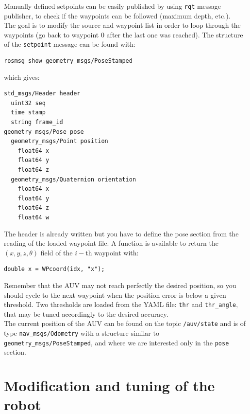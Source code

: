 \documentclass{ecnreport}
\begin{document}
Manually defined setpoints can be easily published by using \texttt{rqt} message publisher, to check if the waypoints can be followed (maximum depth, etc.).\\

The goal is to modify the source and waypoint list in order to loop through the waypoints (go back to waypoint 0 after the last one was reached).
The structure of the \texttt{setpoint} message can be found with:
\begin{center}
\begin{lstlisting}
rosmsg show geometry_msgs/PoseStamped
\end{lstlisting}
\end{center}
which gives:
\begin{center}
\begin{lstlisting}
std_msgs/Header header
  uint32 seq
  time stamp
  string frame_id
geometry_msgs/Pose pose
  geometry_msgs/Point position
    float64 x
    float64 y
    float64 z
  geometry_msgs/Quaternion orientation
    float64 x
    float64 y
    float64 z
    float64 w
\end{lstlisting}
\end{center}
The header is already written but you have to define the pose section from the reading of the loaded waypoint file.
A function is available to return the $(x,y,z,\theta)$ field of the $i-$th waypoint with:
\begin{center}\cppstyle
\begin{lstlisting}
double x = WPcoord(idx, "x");
\end{lstlisting}
\end{center}
Remember that the AUV may not reach perfectly the desired position, so you should cycle to the next waypoint when the position error is below a given threshold.
Two thresholds are loaded from the YAML file: \texttt{thr} and \texttt{thr\_angle}, that may be tuned accordingly to the desired accuracy.\\
The current position of the AUV can be found on the topic \texttt{/auv/state} and is of type \texttt{nav\_msgs/Odometry} with a structure similar to \texttt{geometry\_msgs/PoseStamped}, and where we are interested only
in the \texttt{pose} section.\\


\section{Modification and tuning of the robot}
\end{document}
